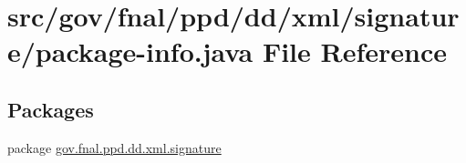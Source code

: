 \hypertarget{dd_2xml_2signature_2package-info_8java}{\section{src/gov/fnal/ppd/dd/xml/signature/package-\/info.java File Reference}
\label{dd_2xml_2signature_2package-info_8java}
}
\subsection*{Packages}
\begin{DoxyCompactItemize}
\item 
package \hyperlink{namespacegov_1_1fnal_1_1ppd_1_1dd_1_1xml_1_1signature}{gov.\-fnal.\-ppd.\-dd.\-xml.\-signature}
\end{DoxyCompactItemize}
